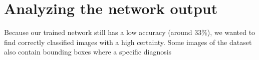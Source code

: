 \section{Analyzing the network output}
Because our trained network still has a low accuracy (around 33\%), we wanted to find correctly classified images with a high certainty.
Some images of the dataset also contain bounding boxes where a specific diagnosis 


